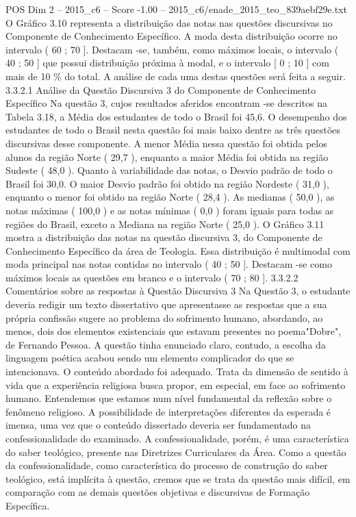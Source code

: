 \begin{textsample}{POS Dim 2 – 2015\_c6 – Score -1.00 – 2015\_c6/enade\_2015\_teo\_839aebf29e.txt}
O Gráfico 3.10 representa a distribuição das notas nas questões discursivas no Componente de Conhecimento Específico.
A moda desta distribuição ocorre no intervalo ( 60 ; 70 ].
Destacam -se, também, como máximos locais, o intervalo ( 40 ; 50 ] que possui distribuição próxima à modal, e o intervalo [ 0 ; 10 ] com mais de 10 \% do total.
A análise de cada uma destas questões será feita a seguir. 3.3.2.1 Análise da Questão Discursiva 3 do Componente de Conhecimento Específico Na questão 3, cujos resultados aferidos encontram -se descritos na Tabela 3.18, a Média dos estudantes de todo o Brasil foi 45,6.
O desempenho dos estudantes de todo o Brasil nesta questão foi mais baixo dentre as três questões discursivas desse componente.
A menor Média nessa questão foi obtida pelos alunos da região Norte ( 29,7 ), enquanto a maior Média foi obtida na região Sudeste ( 48,0 ).
Quanto à variabilidade das notas, o Desvio padrão de todo o Brasil foi 30,0.
O maior Desvio padrão foi obtido na região Nordeste ( 31,0 ), enquanto o menor foi obtido na região Norte ( 28,4 ).
As medianas ( 50,0 ), as notas máximas ( 100,0 ) e as notas mínimas ( 0,0 ) foram iguais para todas as regiões do Brasil, exceto a Mediana na região Norte ( 25,0 ).
O Gráfico 3.11 mostra a distribuição das notas na questão discursiva 3, do Componente de Conhecimento Específico da área de Teologia.
Essa distribuição é multimodal com moda principal nas notas contidas no intervalo ( 40 ; 50 ].
Destacam -se como máximos locais as questões em branco e o intervalo ( 70 ; 80 ]. 3.3.2.2 Comentários sobre as respostas à Questão Discursiva 3 Na Questão 3, o estudante deveria redigir um texto dissertativo que apresentasse as respostas que a sua própria confissão sugere ao problema do sofrimento humano, abordando, ao menos, dois dos elementos existenciais que estavam presentes no poema"Dobre", de Fernando Pessoa.
A questão tinha enunciado claro, contudo, a escolha da linguagem poética acabou sendo um elemento complicador do que se intencionava.
O conteúdo abordado foi adequado.
Trata da dimensão de sentido à vida que a experiência religiosa busca propor, em especial, em face ao sofrimento humano.
Entendemos que estamos num nível fundamental da reflexão sobre o fenômeno religioso.
A possibilidade de interpretações diferentes da esperada é imensa, uma vez que o conteúdo dissertado deveria ser fundamentado na confessionalidade do examinado.
A confessionalidade, porém, é uma característica do saber teológico, presente nas Diretrizes Curriculares da Área.
Como a questão da confessionalidade, como característica do processo de construção do saber teológico, está implícita à questão, cremos que se trata da questão mais difícil, em comparação com as demais questões objetivas e discursivas de Formação Específica.

\end{textsample}
